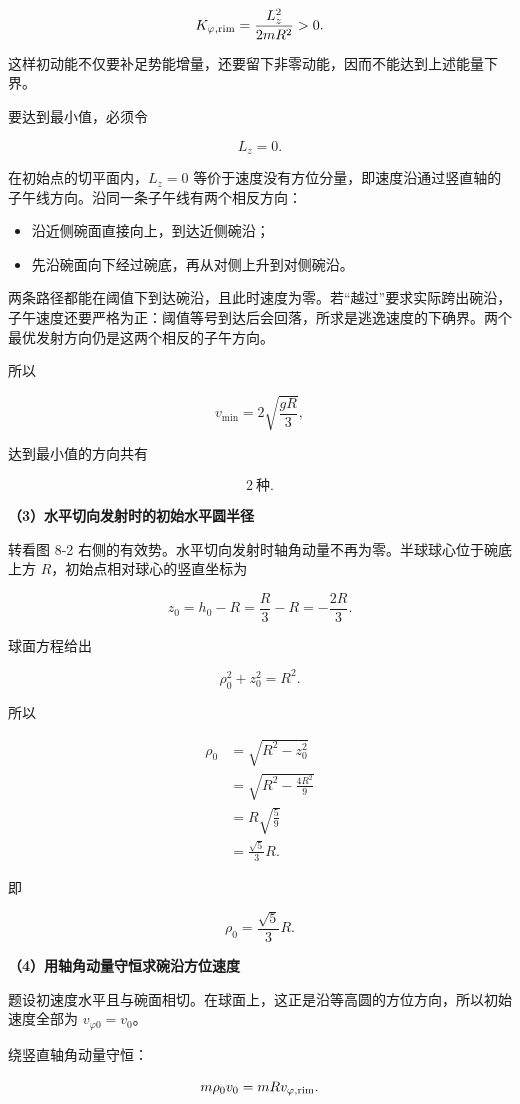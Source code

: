 \documentclass[12pt,a4paper,UTF8]{ctexart}
\newcommand{\tightlist}{\setlength{\itemsep}{0pt}\setlength{\parskip}{0pt}}
\begin{document}
\[K_{\varphi,\rm rim}=\frac{L_z^2}{2mR^2}>0.\]

这样初动能不仅要补足势能增量，还要留下非零动能，因而不能达到上述能量下界。

要达到最小值，必须令

\[L_z=0.\]

在初始点的切平面内，\(L_z=0\)
等价于速度没有方位分量，即速度沿通过竖直轴的子午线方向。沿同一条子午线有两个相反方向：

\begin{itemize}
\tightlist
\item
  沿近侧碗面直接向上，到达近侧碗沿；
\item
  先沿碗面向下经过碗底，再从对侧上升到对侧碗沿。
\end{itemize}

两条路径都能在阈值下到达碗沿，且此时速度为零。若``越过''要求实际跨出碗沿，子午速度还要严格为正：阈值等号到达后会回落，所求是逃逸速度的下确界。两个最优发射方向仍是这两个相反的子午方向。

所以

\[
\boxed{v_{\min}=2\sqrt{\frac{gR}{3}}},
\]

达到最小值的方向共有

\[\boxed{2\ \text{种}}.\]

\textbf{（3）水平切向发射时的初始水平圆半径}

转看图 8-2
右侧的有效势。水平切向发射时轴角动量不再为零。半球球心位于碗底上方
\(R\)，初始点相对球心的竖直坐标为

\[
z_0=h_0-R
=\frac R3-R
=-\frac{2R}{3}.
\]

球面方程给出

\[
\rho_0^2+z_0^2=R^2.
\]

所以

\[
\begin{aligned}
\rho_0
&=\sqrt{R^2-z_0^2}\\
&=\sqrt{R^2-\frac{4R^2}{9}}\\
&=R\sqrt{\frac59}\\
&=\frac{\sqrt5}{3}R.
\end{aligned}
\]

即

\[\boxed{\rho_0=\frac{\sqrt5}{3}R}.\]

\textbf{（4）用轴角动量守恒求碗沿方位速度}

题设初速度水平且与碗面相切。在球面上，这正是沿等高圆的方位方向，所以初始速度全部为
\(v_{\varphi0}=v_0\)。

绕竖直轴角动量守恒：

\[
m\rho_0v_0=mRv_{\varphi,\rm rim}.
\]
\end{document}
